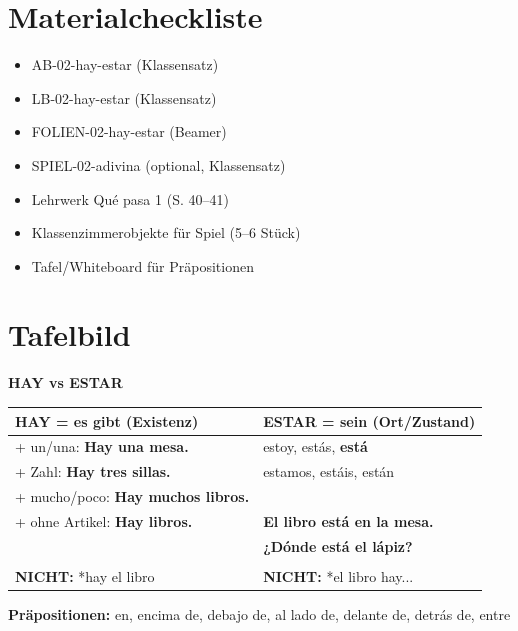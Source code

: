 \documentclass[11pt,a4paper]{article}
\newcommand{\es}[1]{\textbf{#1}}
\begin{document}
\section*{Materialcheckliste}

\begin{itemize}[nosep]
    \item[$\square$] AB-02-hay-estar (Klassensatz)
    \item[$\square$] LB-02-hay-estar (Klassensatz)
    \item[$\square$] FOLIEN-02-hay-estar (Beamer)
    \item[$\square$] SPIEL-02-adivina (optional, Klassensatz)
    \item[$\square$] Lehrwerk Qué pasa 1 (S. 40--41)
    \item[$\square$] Klassenzimmerobjekte für Spiel (5--6 Stück)
    \item[$\square$] Tafel/Whiteboard für Präpositionen
\end{itemize}

\vspace{0.5cm}

\section*{Tafelbild}

\begin{tcolorbox}[colback=white, colframe=grau]
\textbf{HAY vs ESTAR}

\vspace{0.3cm}
\begin{tabular}{p{6.5cm}|p{6.5cm}}
\textbf{HAY = es gibt (Existenz)} & \textbf{ESTAR = sein (Ort/Zustand)} \\
\hline
+ un/una: \es{Hay una mesa.} & estoy, estás, \textbf{está} \\
+ Zahl: \es{Hay tres sillas.} & estamos, estáis, están \\
+ mucho/poco: \es{Hay muchos libros.} & \\
+ ohne Artikel: \es{Hay libros.} & \es{El libro está en la mesa.} \\
& \es{¿Dónde está el lápiz?} \\
\hline
\multicolumn{2}{c}{} \\
\textbf{NICHT:} *hay el libro & \textbf{NICHT:} *el libro hay... \\
\end{tabular}

\vspace{0.3cm}

\textbf{Präpositionen:} en, encima de, debajo de, al lado de, delante de, detrás de, entre
\end{tcolorbox}
\end{document}
